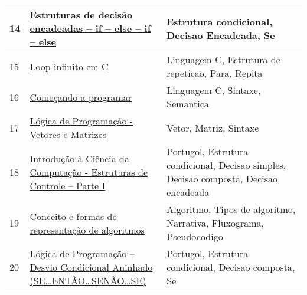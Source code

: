 \begin{longtable}{| p{} | p{} | p{} |}
14  & \href{http://linguagemc.com.br/estruturas-de-decisao-encadeadas-if-else-if-else/}{\color{blue} Estruturas de decisão encadeadas – if – else – if – else                            } & Estrutura condicional, Decisao Encadeada, Se                                                                                                      \\ \hline
15  & \href{http://linguagemc.com.br/loop-infinito-em-c/}{\color{blue} Loop infinito em C                                                                  } & Linguagem C, Estrutura de repeticao, Para, Repita                                                                                                 \\ \hline
16  & \href{http://marmsx.msxall.com/cursos/c3.html}{\color{blue} Começando a programar                                                               } & Linguagem C, Sintaxe, Semantica                                                                                                                   \\ \hline
17  & \href{http://nerdsti.com.br/?p=259}{\color{blue} Lógica de Programação - Vetores e Matrizes                                          } & Vetor, Matriz, Sintaxe                                                                                                                            \\ \hline
18  & \href{http://wiki.icmc.usp.br/images/5/57/Estruturas\_Controle\_I\_SCC0120\_v2.pdf}{\color{blue} Introdução à Ciência da Computação - Estruturas de Controle – Parte I               } & Portugol, Estrutura condicional, Decisao simples, Decisao composta, Decisao encadeada                                                             \\ \hline
19  & \href{http://www.berriel.com.br/ltpi/aula01/aula01.htm}{\color{blue} Conceito e formas de representação de algoritmos                                    } & Algoritmo, Tipos de algoritmo, Narrativa, Fluxograma, Pseudocodigo                                                                                \\ \hline
20  & \href{http://www.bosontreinamentos.com.br/logica-de-programacao/12-logica-de-programacao-desvio-condicional-aninhado-se-entao-senao-se/}{\color{blue} Lógica de Programação – Desvio Condicional Aninhado (SE…ENTÃO…SENÃO…SE)             } & Portugol, Estrutura condicional, Decisao composta, Se                                                                                             \\ \hline

\end{longtable}
